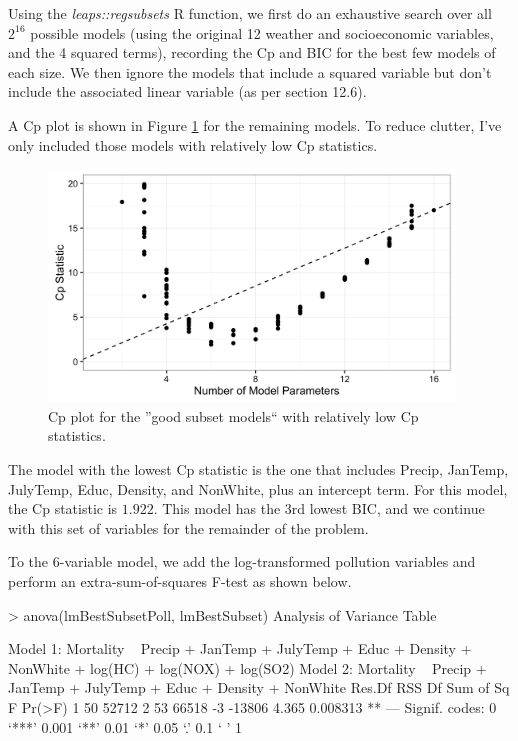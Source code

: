 \documentclass[11pt]{exam} %
\newenvironment{codeSmall}%
   {\par\noindent\adjustbox{margin=1ex,bgcolor=shadecolor,margin=0ex \medskipamount}\bgroup\minipage\linewidth\verbatim\footnotesize}%
   {\endverbatim\endminipage\egroup}
\begin{document}
\begin{questions}
\begin{parts}
Using the \textit{leaps::regsubsets} R function, we first do an exhaustive search over all $2^16$ possible models (using the original 12 weather and socioeconomic variables, and the 4 squared terms), recording the Cp and BIC for the best few models of each size. We then ignore the models that include a squared variable but don't include the associated linear variable (as per section 12.6).

A Cp plot is shown in Figure \ref{fig:1a_cp} for the remaining models. To reduce clutter, I've only included those models with relatively low Cp statistics.

\begin{figure}[!h]
	\centering
	\captionsetup{width=0.8\textwidth}
	\includegraphics[width=4.25in]{1a_cp.png}
	\caption{Cp plot for the ''good subset models`` with relatively low Cp statistics.}
	\label{fig:1a_cp}
\end{figure}

The model with the lowest Cp statistic is the one that includes Precip, JanTemp, JulyTemp, Educ, Density, and NonWhite, plus an intercept term. For this model, the Cp statistic is $1.922$. This model has the 3rd lowest BIC, and we continue with this set of variables for the remainder of the problem.

To the 6-variable model, we add the log-transformed pollution variables and perform an extra-sum-of-squares F-test as shown below.

\begin{codeSmall}
> anova(lmBestSubsetPoll, lmBestSubset)
Analysis of Variance Table

Model 1: Mortality ~ Precip + JanTemp + JulyTemp + Educ + Density + NonWhite + 
    log(HC) + log(NOX) + log(SO2)
Model 2: Mortality ~ Precip + JanTemp + JulyTemp + Educ + Density + NonWhite
  Res.Df   RSS Df Sum of Sq     F   Pr(>F)   
1     50 52712                               
2     53 66518 -3    -13806 4.365 0.008313 **
---
Signif. codes:  0 ‘***’ 0.001 ‘**’ 0.01 ‘*’ 0.05 ‘.’ 0.1 ‘ ’ 1
\end{codeSmall}


\end{parts}
\end{questions}
\end{document}
